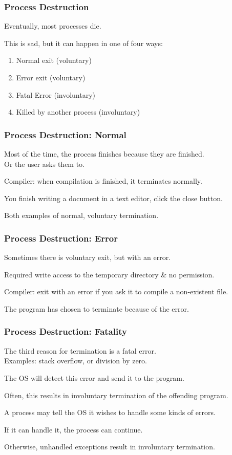 \begin{frame}
\frametitle{Process Destruction}

Eventually, most processes die. 

This is sad, but it can happen in one of four ways:
\begin{enumerate}
	\item Normal exit (voluntary) 
	\item Error exit (voluntary)
	\item Fatal Error (involuntary)
	\item Killed by another process (involuntary)
\end{enumerate}


\end{frame}

\begin{frame}
\frametitle{Process Destruction: Normal}

Most of the time, the process finishes because they are finished.\\
\quad Or the user asks them to. 

Compiler: when compilation is finished, it terminates normally. 

You finish writing a document in a text editor, click the close button.

Both examples of normal, voluntary termination.

\end{frame}

\begin{frame}
\frametitle{Process Destruction: Error}

Sometimes there is voluntary exit, but with an error. 

Required write access to the temporary directory \& no permission.

Compiler: exit with an error if you ask it to compile a non-existent file.

The program has chosen to terminate because of the error.

\end{frame}

\begin{frame}
\frametitle{Process Destruction: Fatality}

The third reason for termination is a fatal error.\\
\quad Examples: stack overflow, or division by zero. 

The OS will detect this error and send it to the program. 

Often, this results in involuntary termination of the offending program. 

A process may tell the OS it wishes to handle some kinds of errors.

If it can handle it, the process can continue.

Otherwise, unhandled exceptions result in involuntary termination.

\end{frame}

